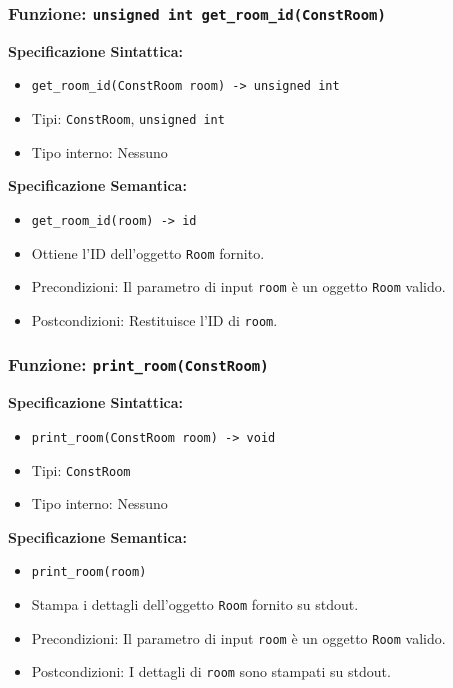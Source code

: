 \documentclass[11pt]{scrartcl} %
\begin{document}
\subsubsection{Funzione: \texttt{unsigned int get\_room\_id(ConstRoom)}}

\textbf{Specificazione Sintattica:}
\begin{itemize}
	\item \texttt{get\_room\_id(ConstRoom room) -> unsigned int}
	\item Tipi: \texttt{ConstRoom}, \texttt{unsigned int}
	\item Tipo interno: Nessuno
\end{itemize}

\textbf{Specificazione Semantica:}
\begin{itemize}
	\item \texttt{get\_room\_id(room) -> id}
	\item Ottiene l'ID dell'oggetto \texttt{Room} fornito.
	\item Precondizioni: Il parametro di input \texttt{room} è un oggetto \texttt{Room} valido.
	\item Postcondizioni: Restituisce l'ID di \texttt{room}.
\end{itemize}

\subsubsection{Funzione: \texttt{print\_room(ConstRoom)}}

\textbf{Specificazione Sintattica:}
\begin{itemize}
	\item \texttt{print\_room(ConstRoom room) -> void}
	\item Tipi: \texttt{ConstRoom}
	\item Tipo interno: Nessuno
\end{itemize}

\textbf{Specificazione Semantica:}
\begin{itemize}
	\item \texttt{print\_room(room)}
	\item Stampa i dettagli dell'oggetto \texttt{Room} fornito su stdout.
	\item Precondizioni: Il parametro di input \texttt{room} è un oggetto \texttt{Room} valido.
	\item Postcondizioni: I dettagli di \texttt{room} sono stampati su stdout.
\end{itemize}
\end{document}
